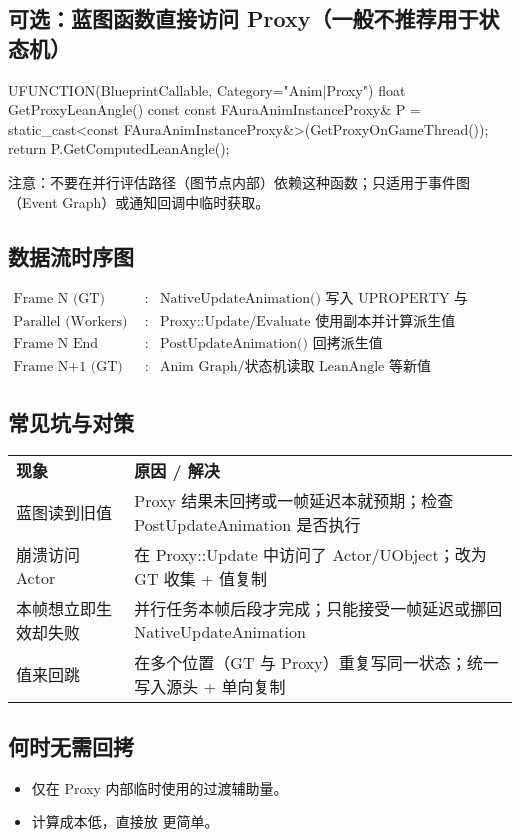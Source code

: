 \documentclass[10pt,openright,oneside,CJKmath]{MyBook}
\begin{document}
\subsection{可选：蓝图函数直接访问 Proxy（一般不推荐用于状态机）}
\begin{code}
UFUNCTION(BlueprintCallable, Category="Anim|Proxy")
float GetProxyLeanAngle() const
{
    const FAuraAnimInstanceProxy& P =
        static_cast<const FAuraAnimInstanceProxy&>(GetProxyOnGameThread());
    return P.GetComputedLeanAngle();
}
\end{code}
注意：不要在并行评估路径（图节点内部）依赖这种函数；只适用于事件图（Event Graph）或通知回调中临时获取。

\subsection{数据流时序图}
\[
\begin{array}{lcl}
\text{Frame N (GT)} &: & \text{NativeUpdateAnimation() 写入 UPROPERTY 与 Proxy} \\
\text{Parallel (Workers)} &: & \text{Proxy::Update/Evaluate 使用副本并计算派生值} \\
\text{Frame N End (GT)} &: & \text{PostUpdateAnimation() 回拷派生值} \\
\text{Frame N+1 (GT)} &: & \text{Anim Graph/状态机读取 LeanAngle 等新值}
\end{array}
\]

\subsection{常见坑与对策}
\begin{tabular}{p{4cm} p{9.5cm}}
\textbf{现象} & \textbf{原因 / 解决} \\
蓝图读到旧值 & Proxy 结果未回拷或一帧延迟本就预期；检查 PostUpdateAnimation 是否执行 \\
崩溃访问 Actor & 在 Proxy::Update 中访问了 Actor/UObject；改为 GT 收集 + 值复制 \\
本帧想立即生效却失败 & 并行任务本帧后段才完成；只能接受一帧延迟或挪回 NativeUpdateAnimation \\
值来回跳 & 在多个位置（GT 与 Proxy）重复写同一状态；统一写入源头 + 单向复制 \\
\end{tabular}

\subsection{何时无需回拷}
\begin{itemize}
  \item 仅在 Proxy 内部临时使用的过渡辅助量。
  \item 计算成本低，直接放  更简单。
\end{itemize}
\end{document}
